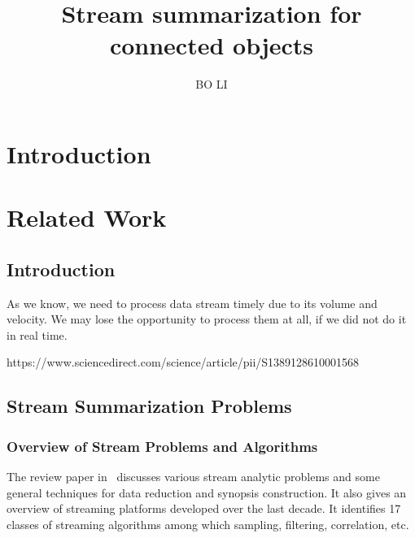 \documentclass{report}
\title{Stream summarization for connected objects}
\author{BO LI }
\begin{document}
\maketitle

\chapter{Introduction}

\chapter{Related Work}

\section{Introduction}

As we know, we need to process data stream timely due to its volume and velocity. We may lose the opportunity to process them at all, if we did not do it in real time.

https://www.sciencedirect.com/science/article/pii/S1389128610001568

\section{Stream Summarization Problems}

\subsection{Overview of Stream Problems and Algorithms}

The review paper in~\cite{kejariwal2015real} discusses various stream analytic problems and some general techniques for data reduction and synopsis construction. It also gives an overview of streaming platforms developed over the last decade. It identifies 17 classes of streaming algorithms among which sampling, filtering, correlation, etc. 
\end{document}
